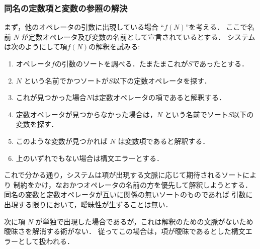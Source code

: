 \documentclass[a4paper,oneside,10pt]{memoir}
\begin{document}
\subsubsection{同名の定数項と変数の参照の解決}
まず，他のオペレータの引数に出現している場合 ``$f(N)$''を考える．
ここで名前 $N$ が定数オペレータ及び変数の名前として宣言されているとする．
システムは次のようにして項$f(N)$の解釈を試みる:
\begin{enumerate}
\item オペレータ$f$の引数のソートを調べる．たまたまこれが$S$であったとする．
\item $N$ という名前でかつソートが$S$以下の定数オペレータを探す．
\item これが見つかった場合$N$は定数オペレータの項であると解釈する．
\item 定数オペレータが見つからなかった場合は，$N$ という名前でソート$S$以下の変数を探す．
\item このような変数が見つかれば $N$ は変数項であると解釈する．
\item 上のいずれでもない場合は構文エラーとする．
\end{enumerate}
これで分かる通り，システムは項が出現する文脈に応じて期待されるソートにより%
制約をかけ，なおかつオペレータの名前の方を優先して解釈しようとする．
同名の変数と定数オペレータが互いに関係の無いソートのものであれば%
引数に出現する限りにおいて，曖昧性が生ずることは無い．

次に項 $N$ が単独で出現した場合であるが，これは解釈のための文脈がないため%
曖昧さを解消する術がない．
従ってこの場合は，項が曖昧であるとした構文エラーとして扱われる．
\end{document}
